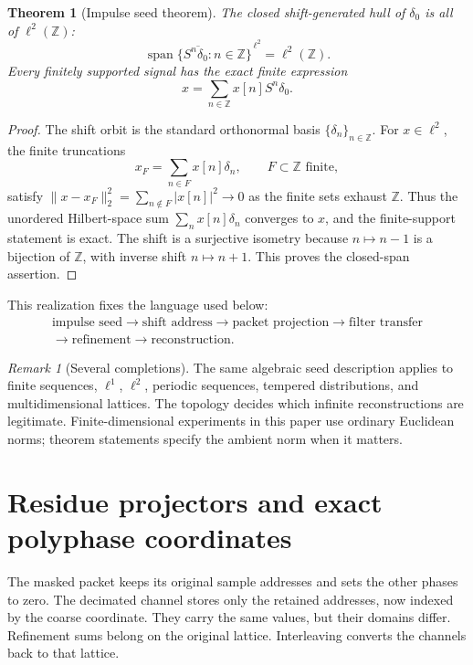 \documentclass[11pt,letterpaper]{article}
\newtheorem{theorem}{Theorem}[section]
\theoremstyle{plain}
\theoremstyle{plain}
\theoremstyle{plain}
\theoremstyle{definition}
\theoremstyle{definition}
\theoremstyle{definition}
\theoremstyle{definition}
\theoremstyle{remark}
\newtheorem{remark}[remark]{Remark}
\theoremstyle{remark}
\theoremstyle{remark}
\theoremstyle{remark}
\newcommand{\bbZ}{\mathbb Z}
\begin{document}
\begin{theorem}[Impulse seed theorem]\label{result:01}
The closed shift-generated hull of $\delta_0$ is all of $\ell^2(\bbZ)$:
\[
\boxed{
\overline{\operatorname{span}\{S^n\delta_0:n\in\bbZ\}}^{\,\ell^2}
=\ell^2(\bbZ).
}
\]
Every finitely supported signal has the exact finite expression
\[
x=\sum_{n\in\bbZ}x[n]S^n\delta_0.
\]
\end{theorem}

\begin{proof}
The shift orbit is the standard orthonormal basis $\{\delta_n\}_{n\in\bbZ}$. For $x\in\ell^2$, the finite truncations
\[
x_F=\sum_{n\in F}x[n]\delta_n,\qquad F\subset\bbZ\text{ finite},
\]
satisfy $\|x-x_F\|_2^2=\sum_{n\notin F}|x[n]|^2\to0$ as the finite sets exhaust $\bbZ$. Thus the unordered Hilbert-space sum $\sum_nx[n]\delta_n$ converges to $x$, and the finite-support statement is exact. The shift is a surjective isometry because $n\mapsto n-1$ is a bijection of $\bbZ$, with inverse shift $n\mapsto n+1$. This proves the closed-span assertion.
\end{proof}

This realization fixes the language used below:
\[
\begin{gathered}
\text{impulse seed}\longrightarrow\text{shift address}\longrightarrow\text{packet projection}\longrightarrow\text{filter transfer}\\
\longrightarrow\text{refinement}\longrightarrow\text{reconstruction}.
\end{gathered}
\]

\begin{remark}[Several completions]\label{core:record:02}
The same algebraic seed description applies to finite sequences, $\ell^1$, $\ell^2$, periodic sequences, tempered distributions, and multidimensional lattices. The topology decides which infinite reconstructions are legitimate. Finite-dimensional experiments in this paper use ordinary Euclidean norms; theorem statements specify the ambient norm when it matters.
\end{remark}

\section{Residue projectors and exact polyphase coordinates}\label{core:section:02}

\begin{keyidea}[title={A packet has two useful representations}]
The masked packet keeps its original sample addresses and sets the other phases to zero. The decimated channel stores only the retained addresses, now indexed by the coarse coordinate. They carry the same values, but their domains differ. Refinement sums belong on the original lattice. Interleaving converts the channels back to that lattice.
\end{keyidea}
\end{document}
